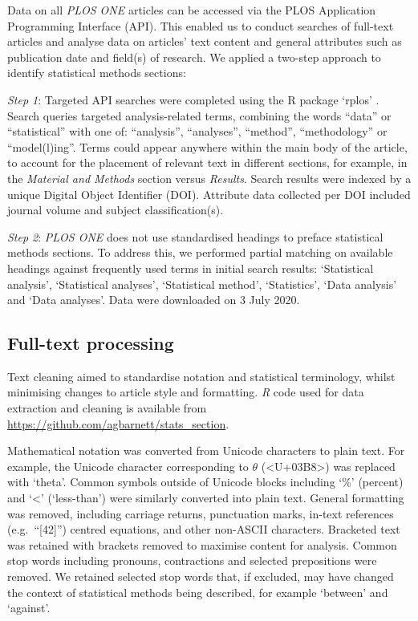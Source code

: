 \documentclass[12pt]{article}
\begin{document}
Data on all \emph{PLOS ONE} articles can be accessed via the PLOS
Application Programming Interface (API). This enabled us to conduct
searches of full-text articles and analyse data on articles' text
content and general attributes such as publication date and field(s) of
research. We applied a two-step
approach to identify statistical methods sections:

\emph{Step 1}: Targeted API searches were completed using the R package
`rplos' \citep{rplos}. Search queries targeted analysis-related terms,
combining the words ``data'' or ``statistical'' with one of:
``analysis'', ``analyses'', ``method'', ``methodology'' or
``model(l)ing''. Terms could appear anywhere within the main body of the
article, to account for the placement of relevant text in different
sections, for example, in the \emph{Material and Methods} section versus
\emph{Results}. Search results were indexed by a unique Digital Object
Identifier (DOI). Attribute data collected per DOI included journal
volume and subject classification(s).

\emph{Step 2}: \emph{PLOS ONE} does not use standardised headings
to preface statistical methods sections. To address this, we performed
partial matching on available headings against frequently used terms in
initial search results: `Statistical analysis', `Statistical analyses',
`Statistical method', `Statistics', `Data analysis' and `Data analyses'. Data were downloaded on 3 July 2020.

\subsection{Full-text processing}
\label{sec:methods-cleaning}

Text cleaning aimed to standardise notation and statistical terminology,
whilst minimising changes to article style and formatting. \emph{R} code
used for data extraction and cleaning is available from
\url{https://github.com/agbarnett/stats_section}.

Mathematical notation was converted from Unicode characters to plain
text. For example, the Unicode character corresponding to \(\theta\)
(\textless U+03B8\textgreater) was replaced with `theta'. Common symbols
outside of Unicode blocks including `\%' (percent) and `\textless{}'
(`less-than') were similarly converted into plain text. General
formatting was removed, including carriage returns, punctuation marks,
in-text references (e.g.~``{[}42{]}'') centred equations, and other
non-ASCII characters. Bracketed text was retained with brackets removed to
maximise content for analysis. Common stop words
including pronouns, contractions and selected prepositions were removed.
We retained selected stop words that, if excluded, may have changed the
context of statistical methods being described, for example `between'
and `against'.
\end{document}
